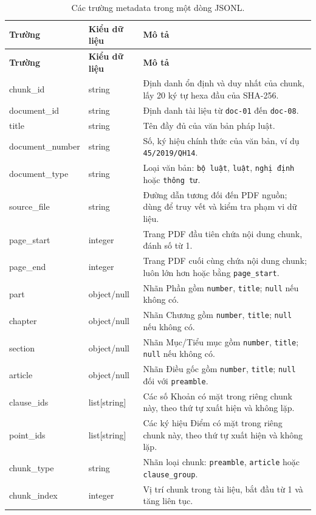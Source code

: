 \documentclass[12pt,a4paper]{article}
\newcommand{\code}[1]{\texttt{#1}}
\newcommand{\nullvalue}{\texttt{null}}
\begin{document}
\begin{longtable}{>{\ttfamily}p{3.5cm}p{2.7cm}p{7.6cm}}
\caption{Các trường metadata trong một dòng JSONL.}\label{tab:metadata-schema}\\
\toprule
\normalfont\textbf{Trường} & \textbf{Kiểu dữ liệu} & \textbf{Mô tả} \\
\midrule
\endfirsthead
\toprule
\normalfont\textbf{Trường} & \textbf{Kiểu dữ liệu} & \textbf{Mô tả} \\
\midrule
\endhead
chunk\_id & string & Định danh ổn định và duy nhất của chunk, lấy 20 ký tự hexa đầu của SHA-256. \\
document\_id & string & Định danh tài liệu từ \code{doc-01} đến \code{doc-08}. \\
title & string & Tên đầy đủ của văn bản pháp luật. \\
document\_number & string & Số, ký hiệu chính thức của văn bản, ví dụ \code{45/2019/QH14}. \\
document\_type & string & Loại văn bản: \code{bộ luật}, \code{luật}, \code{nghị định} hoặc \code{thông tư}. \\
source\_file & string & Đường dẫn tương đối đến PDF nguồn; dùng để truy vết và kiểm tra phạm vi dữ liệu. \\
page\_start & integer & Trang PDF đầu tiên chứa nội dung chunk, đánh số từ 1. \\
page\_end & integer & Trang PDF cuối cùng chứa nội dung chunk; luôn lớn hơn hoặc bằng \code{page\_start}. \\
part & object/null & Nhãn Phần gồm \code{number}, \code{title}; \nullvalue{} nếu không có. \\
chapter & object/null & Nhãn Chương gồm \code{number}, \code{title}; \nullvalue{} nếu không có. \\
section & object/null & Nhãn Mục/Tiểu mục gồm \code{number}, \code{title}; \nullvalue{} nếu không có. \\
article & object/null & Nhãn Điều gốc gồm \code{number}, \code{title}; \nullvalue{} đối với \code{preamble}. \\
clause\_ids & list[string] & Các số Khoản có mặt trong riêng chunk này, theo thứ tự xuất hiện và không lặp. \\
point\_ids & list[string] & Các ký hiệu Điểm có mặt trong riêng chunk này, theo thứ tự xuất hiện và không lặp. \\
chunk\_type & string & Nhãn loại chunk: \code{preamble}, \code{article} hoặc \code{clause\_group}. \\
chunk\_index & integer & Vị trí chunk trong tài liệu, bắt đầu từ 1 và tăng liên tục. \\

\end{longtable}
\end{document}
